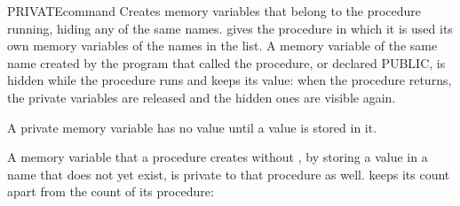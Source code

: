 \begin{XbaseEntry}{PRIVATE}{command}
Creates memory variables that belong to the procedure running, hiding any of
the same names.
\Syntax
{}
\Usage
{} gives the procedure in which it is used its own memory variables
of the names in the list.  A memory variable of the same name created by the
program that called the procedure, or declared PUBLIC, is hidden while the
procedure runs and keeps its value: when the procedure returns, the private
variables are released and the hidden ones are visible again.

A private memory variable has no value until a value is stored in it.

A memory variable that a procedure creates without , by storing a
value in a name that does not yet exist, is private to that procedure as well.
\Examples
{} keeps its count apart from the count of its procedure:
\end{XbaseEntry}

